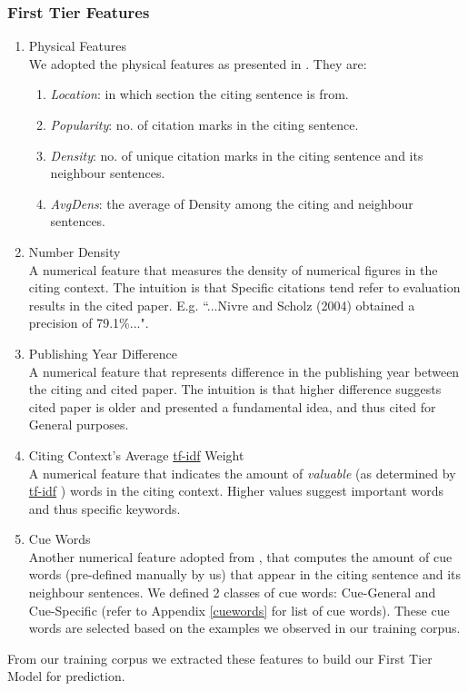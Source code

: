 \subsubsection{First Tier Features}
\begin{enumerate}
\item Physical Features \\
We adopted the physical features as presented in \cite{dongensemble}. They are:
\begin{enumerate}
\item \textit{Location}: in which section the citing sentence is from.
\item \textit{Popularity}: no. of citation marks in the citing sentence.
\item \textit{Density}: no. of unique citation marks in the citing sentence and its neighbour sentences.
\item \textit{AvgDens}: the average of Density among the citing and neighbour sentences.
\end{enumerate}

\item Number Density \\
A numerical feature that measures the density of numerical figures in the citing context. The intuition is that Specific citations tend refer to evaluation results in the cited paper. E.g. ``...Nivre and Scholz (2004) obtained a precision of 79.1\%...".

\item Publishing Year Difference \\
A numerical feature that represents difference in the publishing year between the citing and cited paper. The intuition is that higher difference suggests cited paper is older and presented a fundamental idea, and thus cited for General purposes.

\item Citing Context's Average \url{tf-idf} Weight \\
A numerical feature that indicates the amount of \textit{valuable} (as determined by \url{tf-idf} \cite{irtextbook}) words in the citing context. Higher values suggest important words and thus specific keywords.

\item Cue Words \\
Another numerical feature adopted from \cite{dongensemble}, that computes the amount of cue words (pre-defined manually by us) that appear in the citing sentence and its neighbour sentences. We defined 2 classes of cue words: Cue-General and Cue-Specific (refer to Appendix \ref{cuewords} for list of cue words). These cue words are selected based on the examples we observed in our training corpus.
\end{enumerate}
From our training corpus we extracted these features to build our First Tier Model for prediction.

